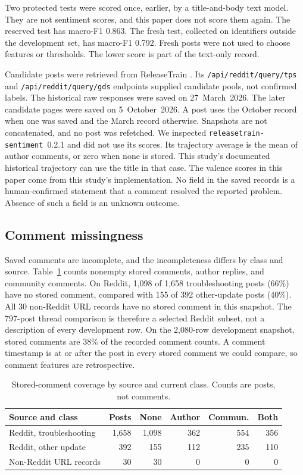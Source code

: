 \documentclass[conference,letterpaper]{IEEEtran}
\begin{document}
Two protected tests were scored once, earlier, by a title-and-body text model. They are not sentiment scores, and this paper does not score them again. The reserved test has macro-F1 0.863. The fresh test, collected on identifiers outside the development set, has macro-F1 0.792. Fresh posts were not used to choose features or thresholds. The lower score is part of the text-only record.

Candidate posts were retrieved from \mbox{ReleaseTrain} \cite{ReleaseTrainDocs}. Its \texttt{/api/reddit/query/tps} and \texttt{/api/reddit/query/gds} endpoints supplied candidate pools, not confirmed labels. The historical raw responses were saved on 27~March~2026. The later candidate pages were saved on 5~October~2026. A post uses the October record when one was saved and the March record otherwise. Snapshots are not concatenated, and no post was refetched. We inspected \texttt{releasetrain-sentiment}~0.2.1 and did not use its scores. Its trajectory average is the mean of author comments, or zero when none is stored. This study's documented historical trajectory can use the title in that case. The valence scores in this paper come from this study's implementation. No field in the saved records is a human-confirmed statement that a comment resolved the reported problem. Absence of such a field is an unknown outcome.

\subsection{Comment missingness}
Saved comments are incomplete, and the incompleteness differs by class and source. Table~\ref{tab:miss} counts nonempty stored comments, author replies, and community comments. On Reddit, 1,098 of 1,658 troubleshooting posts (66\%) have no stored comment, compared with 155 of 392 other-update posts (40\%). All 30 non-Reddit URL records have no stored comment in this snapshot. The 797-post thread comparison is therefore a selected Reddit subset, not a description of every development row. On the 2,080-row development snapshot, stored comments are 38\% of the recorded comment counts. A comment timestamp is at or after the post in every stored comment we could compare, so comment features are retrospective.

\begin{table}[t]
\caption{Stored-comment coverage by source and current class. Counts are posts, not comments.}
\label{tab:miss}
\centering
\footnotesize
\setlength{\tabcolsep}{3pt}
\begin{tabular}{>{\raggedright\arraybackslash}p{2.15cm}rrrrr}
\toprule
Source and class & Posts & None & Author & Commun. & Both \\
\midrule
Reddit, troubleshooting & 1,658 & 1,098 & 362 & 554 & 356 \\
Reddit, other update & 392 & 155 & 112 & 235 & 110 \\
Non-Reddit URL records & 30 & 30 & 0 & 0 & 0 \\
\bottomrule
\end{tabular}
\end{table}
\end{document}
